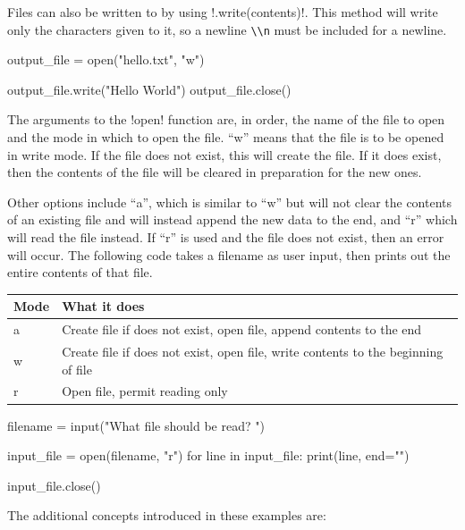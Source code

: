 \documentclass[11pt]{cselabheader}
\begin{document}
Files can also be written to by using \pythoninline!.write(contents)!. This method will write only the characters given to it, so a newline \lstinline{\\n} must be included for a newline.

\begin{python3code}
output_file = open("hello.txt", "w")

output_file.write("Hello World\n")
output_file.close()
\end{python3code}

The arguments to the \pythoninline!open! function are, in order, the name of the
file to open and the mode in which to open the file. ``w'' means that the file
is to be opened in write mode. If the file does not exist, this will create the
file. If it does exist, then the contents of the file will be cleared in
preparation for the new ones.

Other options include ``a'', which is similar to ``w'' but will not clear the
contents of an existing file and will instead append the new data to the end,
and ``r'' which will read the file instead. If ``r'' is used and the file does
not exist, then an error will occur. The following code takes a filename as user
input, then prints out the entire contents of that file.

\begin{table}[!ht]
  \centering
  \begin{tabular}{ll}
    Mode & What it does \\
    \midrule
    a & Create file if does not exist, open file, append contents to the end \\
    w & Create file if does not exist, open file, write contents to the beginning
    of file \\
    r & Open file, permit reading only \\
  \end{tabular}
\end{table}

\begin{python3code}
filename = input("What file should be read? ")

input_file = open(filename, "r")
for line in input_file:
  print(line, end="")

input_file.close()
\end{python3code}

The additional concepts introduced in these examples are:
\end{document}
